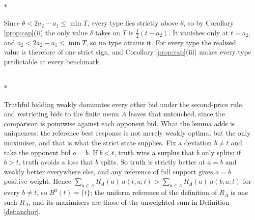 \documentclass[12pt]{article}
\makeatletter
\theoremstyle{definition}
\renewenvironment{proof}[1][\proofname]{\par
  \pushQED{\qed}%
  \normalfont \topsep6\p@\@plus6\p@\relax
  \trivlist
  \item[\hskip\labelsep\itshape #1\@addpunct{.}]\mbox{}\\*
  \ignorespaces
}{%
  \popQED\endtrivlist\@endpefalse
}
\makeatother
\begin{document}
\begin{proof}[Proof of Corollary \ref{cor:floor}]
Since $\theta < 2a_2 - a_1 \le \min T$, every type lies strictly above $\theta$, so by Corollary \ref{prop:cap}(ii) the only value $\delta$ takes on $T$ is $\tfrac12 (t - a_2)$. It vanishes only at $t = a_2$, and $a_2 < 2a_2 - a_1 \le \min T$, so no type attains it. For every type the realised value is therefore of one strict sign, and Corollary \ref{prop:cap}(iii) makes every type predictable at every benchmark.
\end{proof}

\begin{proof}[Proof of Lemma \ref{lem:truthful}]
Truthful bidding weakly dominates every other bid under the second-price rule, and restricting bids to the finite menu $A$ leaves that untouched, since the comparison is pointwise against each opponent bid. What the lemma adds is uniqueness: the reference best response is not merely weakly optimal but the only maximiser, and that is what the strict state supplies. Fix a deviation $b \neq t$ and take the opponent bid $a = b$. If $b < t$, truth wins a surplus that $b$ only splits; if $b > t$, truth avoids a loss that $b$ splits. So truth is strictly better at $a = b$ and weakly better everywhere else, and any reference of full support gives $a = b$ positive weight. Hence $\sum_{a \in A} R_A(a)\, u(t, a; t) > \sum_{a \in A} R_A(a)\, u(b, a; t)$ for every $b \neq t$, so $B^0(t) = \{t\}$; the uniform reference of the definition of $R_A$ is one such $R_A$, and its maximisers are those of the unweighted sum in Definition \ref{def:anchor}.
\end{proof}
\end{document}
